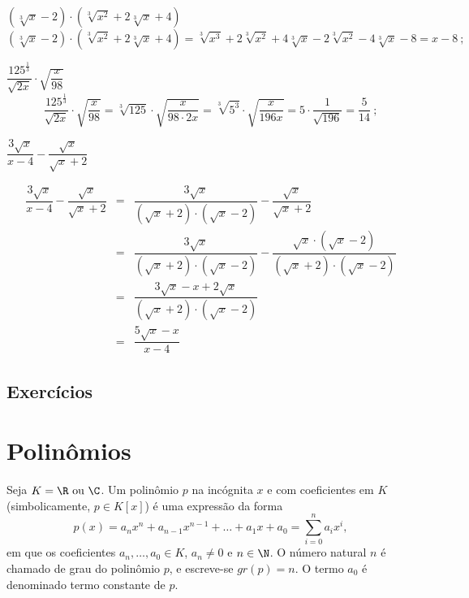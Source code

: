  \begin{exem}
  $(\sqrt[3]{x} - 2) \cdot (\sqrt[3]{x^2} + 2 \sqrt[3]{x} + 4)$
\begin{equation}
(\sqrt[3]{x} - 2) \cdot (\sqrt[3]{x^2} + 2 \sqrt[3]{x} + 4)= \sqrt[3]{x^3} + 2\sqrt[3]{x^2} + 4 \sqrt[3]{x} - 2\sqrt[3]{x^2}- 4 \sqrt[3]{x} - 8= x - 8 \ ;
\end{equation}
   \end{exem}
 
 \begin{exem}
  $\dfrac{125^{\frac{1}{3}}}{\sqrt{2x}} \cdot \sqrt{\dfrac{x}{98}}$
\begin{equation}
\dfrac{125^{\frac{1}{3}}}{\sqrt{2x}} \cdot \sqrt{\dfrac{x}{98}}= \sqrt[3]{125} \cdot \sqrt{\dfrac{x}{98 \cdot 2x}}= \sqrt[3]{5^3} \cdot \sqrt{\dfrac{x}{196x}}= 5 \cdot \dfrac{1}{\sqrt{196}}= \dfrac{5}{14} \ ;
\end{equation}
   \end{exem}
 
 \begin{exem}
   $\dfrac{3\sqrt{x}}{x-4} - \dfrac{\sqrt{x}}{\sqrt{x}+2}$
   
   \begin{eqnarray*}
    \dfrac{3\sqrt{x}}{x-4} - \dfrac{\sqrt{x}}{\sqrt{x}+2} &=& \dfrac{3\sqrt{x}}{(\sqrt{x}+2) \cdot (\sqrt{x}-2)} - \dfrac{\sqrt{x}}{\sqrt{x}+2} \\
    &=& \dfrac{3\sqrt{x}}{(\sqrt{x}+2) \cdot (\sqrt{x}-2)} - \dfrac{\sqrt{x} \cdot (\sqrt{x}-2)}{(\sqrt{x}+2) \cdot (\sqrt{x}-2)} \\
    &=& \dfrac{3\sqrt{x} - x + 2\sqrt{x}}{(\sqrt{x}+2) \cdot (\sqrt{x}-2)} \\
    &=& \dfrac{5\sqrt{x} - x}{x-4}
   \end{eqnarray*}

 \end{exem}
 
 \section{Exercícios}

\construirExer

 
 \chapter{Polinômios}

  \vskip0.3cm
 \colorbox{azul}{
 \begin{minipage}{0.9\linewidth}
 \begin{center}
  Seja $K= \R \text{ ou } \C$. Um polinômio $p$ na incógnita $x$ e com coeficientes em $K$ (simbolicamente, $p \in K[x]$) é uma expressão da forma
\begin{equation}
p(x)= a_nx^n + a_{n-1}x^{n-1}+ \ldots + a_1x+ a_0= \sum_{i=0}^{n} a_ix^i ,
\end{equation}
  em que os coeficientes $a_n, \ldots, a_0 \in K$, $a_n \neq 0$ e $n \in \N$. O número natural $n$ é chamado de grau do polinômio $p$, e escreve-se $gr(p)= n$. O termo $a_0$ é denominado termo constante de $p$.
 \end{center}
 \end{minipage}}
 \vskip0.3cm

